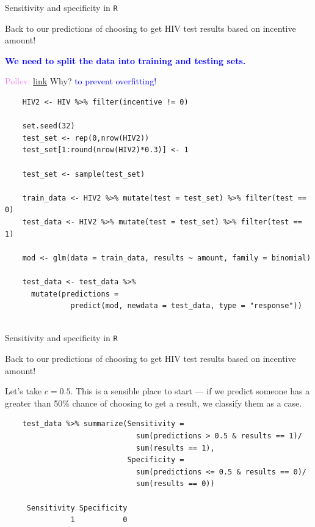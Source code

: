 \documentclass[10pt,t]{beamer}
\begin{document}
\begin{frame}[fragile]{Sensitivity and specificity in \texttt{R}}
	
	\vspace{-7 mm}
	
	Back to our predictions of choosing to get HIV test results based on incentive amount!
	
	\bigskip
	
	\textbf{\textcolor{blue}{We need to split the data into training and testing sets.}}
	
	\textcolor{violet}{Pollev: \href{https://PollEv.com/multiple_choice_polls/5IQzGAIwsCTstq8ZYMssj/respond}{link}} Why? \pause \textcolor{blue}{to prevent overfitting!}
	
	\bigskip
	
	\footnotesize
	\begin{verbatim}
	HIV2 <- HIV %>% filter(incentive != 0)
	
	set.seed(32)
	test_set <- rep(0,nrow(HIV2))
	test_set[1:round(nrow(HIV2)*0.3)] <- 1
	
	test_set <- sample(test_set)
	
	train_data <- HIV2 %>% mutate(test = test_set) %>% filter(test == 0)
	test_data <- HIV2 %>% mutate(test = test_set) %>% filter(test == 1)
	
	mod <- glm(data = train_data, results ~ amount, family = binomial)
	
	test_data <- test_data %>% 
	  mutate(predictions = 
	           predict(mod, newdata = test_data, type = "response"))
	
	\end{verbatim}
	
\end{frame}

\begin{frame}[fragile]{Sensitivity and specificity in \texttt{R}}
	
	\vspace{-7 mm}
	
	Back to our predictions of choosing to get HIV test results based on incentive amount!
	
	\bigskip
	
	Let's take $c =0.5$. This is a sensible place to start --- if we predict someone has a greater than 50\% chance of choosing to get a result, we classify them as a case. 
	
	\footnotesize
	\begin{verbatim}	
	test_data %>% summarize(Sensitivity = 
	                          sum(predictions > 0.5 & results == 1)/
	                          sum(results == 1),
	                        Specificity = 
	                          sum(predictions <= 0.5 & results == 0)/
	                          sum(results == 0))
	                          
	 Sensitivity Specificity
	           1           0
	\end{verbatim}

\end{frame}
\end{document}
